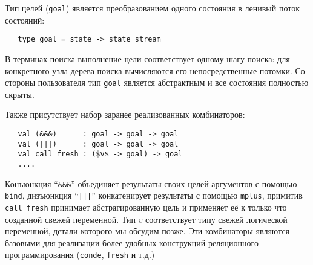 

Тип целей (\lstinline|goal|) является преобразованием одного состояния в ленивый поток состояний:

\begin{lstlisting}
   type goal = state -> state stream
\end{lstlisting}

В терминах поиска выполнение цели соответствует одному шагу поиска: для конкретного узла дерева поиска вычисляются его непосредственные потомки.
Со стороны пользователя тип \lstinline|goal| является абстрактным и все состояния полностью скрыты.

Также присутствует набор заранее реализованных комбинаторов:

\begin{lstlisting}
   val (&&&)      : goal -> goal -> goal
   val (|||)      : goal -> goal -> goal
   val call_fresh : ($v$ -> goal) -> goal
   ....
\end{lstlisting}

Конъюнкция \enquote{\lstinline=&&&=} объединяет результаты своих целей-аргументов с помощью \lstinline|bind|,
дизъюнкция \enquote{\lstinline=|||=} конкатенирует результаты с помощью \lstinline|mplus|,
примитив \lstinline|call_fresh| принимает абстрагированную цель и применяет её к только что созданной свежей переменной.
Тип $v$ соответствует типу свежей логической переменной, детали которого мы обсудим позже.
Эти комбинаторы являются базовыми для реализации более удобных конструкций реляционного программирования (\lstinline|conde|, \lstinline|fresh| и т.д.)

